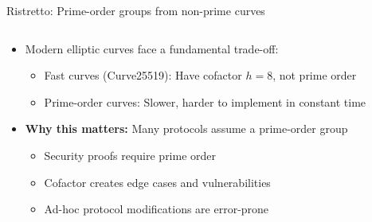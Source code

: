 \documentclass[aspectratio=169, lualatex, handout]{beamer}
\begin{document}
\begin{frame}{Ristretto: Prime-order groups from non-prime curves}
	\begin{columns}[c]
		\begin{column}{1\textwidth}
			\begin{itemize}[<+->]
				\item Modern elliptic curves face a fundamental trade-off:
				      \begin{itemize}
					      \item Fast curves (Curve25519): Have cofactor $h = 8$, not prime order
					      \item Prime-order curves: Slower, harder to implement in constant time
				      \end{itemize}
				\item \textbf{Why this matters:} Many protocols assume a prime-order group
				      \begin{itemize}
					      \item Security proofs require prime order
					      \item Cofactor creates edge cases and vulnerabilities
					      \item Ad-hoc protocol modifications are error-prone
				      \end{itemize}
			\end{itemize}
		\end{column}
	\end{columns}
\end{frame}
\end{document}
